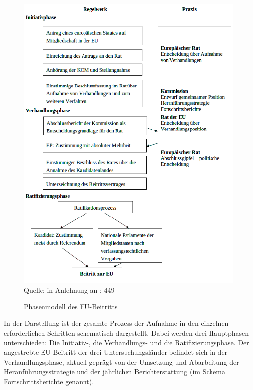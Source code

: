 \begin{figure}[H]
  \centering
   \caption{Phasenmodell des EU-Beitritts }
  \includegraphics[width=5in]{Material/Phasenmodell_ohneRand}\\

\scriptsize{Quelle: in Anlehnung an \cite{wessels}: 449}
\end{figure}
In der Darstellung ist der gesamte Prozess der Aufnahme in den einzelnen erforderlichen Schritten schematisch dargestellt. Dabei werden drei Hauptphasen unterschieden: Die Initiativ-, die Verhandlungs- und die Ratifizierungsphase. Der angestrebte EU-Beitritt der drei Untersuchungsländer befindet sich in der Verhandlungsphase, aktuell geprägt von der Umsetzung und Abarbeitung der Heranführungsstrategie und der jährlichen Berichterstattung (im Schema Fortschrittsberichte genannt).\par

